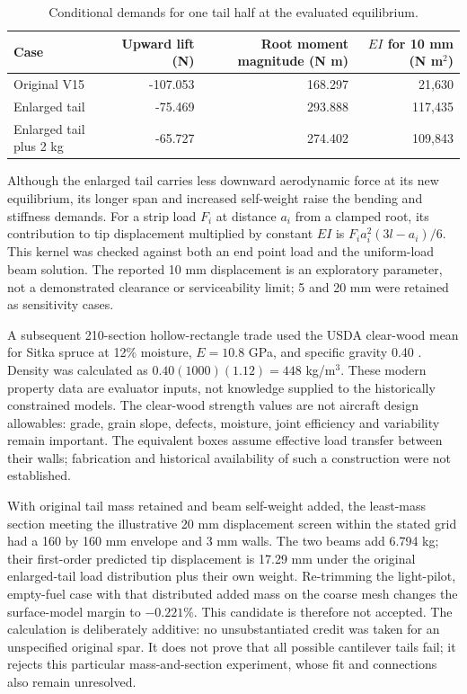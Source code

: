 \documentclass[11pt,a4paper]{article}
\begin{document}
\begin{table}[htbp]\centering\small
\caption{Conditional demands for one tail half at the evaluated equilibrium.}
\label{tab:tail-beam-demand}
\begin{tabular}{lrrr}\toprule
Case & Upward lift (N) & Root moment magnitude (N m) & $EI$ for 10 mm (N m$^2$)\\\midrule
Original V15 & -107.053 & 168.297 & 21,630\\
Enlarged tail & -75.469 & 293.888 & 117,435\\
Enlarged tail plus 2 kg & -65.727 & 274.402 & 109,843\\\bottomrule
\end{tabular}\end{table}

Although the enlarged tail carries less downward aerodynamic force at its
new equilibrium, its longer span and increased self-weight raise the bending
and stiffness demands. For a strip load $F_i$ at distance $a_i$ from a clamped
root, its contribution to tip displacement multiplied by constant $EI$ is
$F_i a_i^2(3l-a_i)/6$. This kernel was checked against both an end point load
and the uniform-load beam solution. The reported 10 mm displacement is an
exploratory parameter, not a demonstrated clearance or serviceability limit;
5 and 20 mm were retained as sensitivity cases.

A subsequent 210-section hollow-rectangle trade used the USDA clear-wood
mean for Sitka spruce at 12\% moisture, $E=10.8$ GPa, and specific gravity
0.40 \cite{ref46}. Density was calculated as $0.40(1000)(1.12)=448$ kg/m$^3$.
These modern property data are evaluator inputs, not knowledge supplied to the
historically constrained models. The clear-wood strength values are not
aircraft design allowables: grade, grain slope, defects, moisture, joint
efficiency and variability remain important. The equivalent boxes assume
effective load transfer between their walls; fabrication and historical
availability of such a construction were not established.

With original tail mass retained and beam self-weight added, the least-mass
section meeting the illustrative 20 mm displacement screen within the stated
grid had a 160 by 160 mm envelope and 3 mm walls. The two beams add 6.794 kg;
their first-order predicted tip displacement is 17.29 mm under the original
enlarged-tail load distribution plus their own weight. Re-trimming the
light-pilot, empty-fuel case with that distributed added mass on the coarse
mesh changes the surface-model margin to $-0.221\%$. This candidate is therefore
not accepted. The calculation is deliberately additive: no unsubstantiated
credit was taken for an unspecified original spar. It does not prove that
all possible cantilever tails fail; it rejects this particular mass-and-section
experiment, whose fit and connections also remain unresolved.
\end{document}
